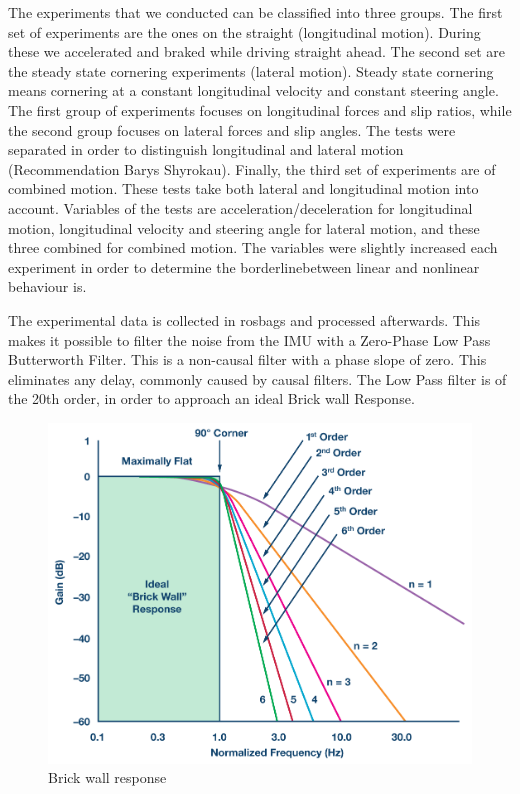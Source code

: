 The experiments that we conducted can be classified into three groups. The first set of experiments are the ones on the straight (longitudinal motion). During these we accelerated and braked while driving straight ahead. The second set are the steady state cornering experiments (lateral motion). Steady state cornering means cornering at a constant longitudinal velocity and constant steering angle. The first group of experiments focuses on longitudinal forces and slip ratios, while the second group focuses on lateral forces and slip angles. The tests were separated in order to distinguish longitudinal and lateral motion (Recommendation Barys Shyrokau). Finally, the third set of experiments are of combined motion. These tests take both lateral and longitudinal motion into account. 
	Variables of the tests are acceleration/deceleration for longitudinal motion, longitudinal velocity and steering angle for lateral motion, and these three combined for  combined motion. The variables were slightly increased each experiment in order to determine the \textquotesingle borderline\textquotesingle  between linear and nonlinear behaviour is.
	
The experimental data is collected in rosbags and processed afterwards. This makes it possible to filter the noise from the IMU with a Zero-Phase Low Pass Butterworth Filter. This is a non-causal filter with a phase slope of zero. This eliminates any delay, commonly caused by causal filters. The Low Pass filter is of the 20th order, in order to approach an ideal \textquotesingle Brick wall Response\textquotesingle .
	\begin{figure}
	\centering
	\includegraphics[scale=0.17]{figure/brickwall.png}
	\caption{Brick wall response}
	\label{fig:brickwall}
	\end{figure}


